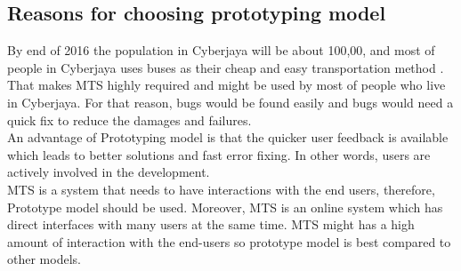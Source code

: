 \pagebreak
\subsection{Reasons for choosing prototyping model}
By end of 2016 the population in Cyberjaya will be about 100,00, and most of people in Cyberjaya uses buses as their cheap and easy transportation method \cite{ReferencePopulationOfCyberjaya}. That makes MTS highly required and might be used by most of people who live in Cyberjaya. For that reason, bugs would be found easily and bugs would need a quick fix to reduce the damages and failures.\\

An advantage of Prototyping model is that the quicker user feedback is available which leads to better solutions and fast error fixing. In other words, users are actively involved in the development.\\

MTS is a system that needs to have interactions with the end users, therefore, Prototype model should be used. Moreover, MTS is an online system which has direct interfaces with many users at the same time. MTS might has a high amount of interaction with the end-users so prototype model is best compared to other models.\\